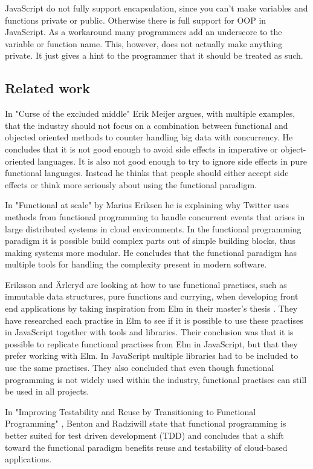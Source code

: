 \documentclass {article}
\begin{document}
JavaScript do not fully support encapsulation, since you can't make variables and functions private or public. Otherwise there is full support for OOP in JavaScript. As a workaround many programmers add an underscore to the variable or function name. This, however, does not actually make anything private. It just gives a hint to the programmer that it should be treated as such.
\subsection{Related work}
In "Curse of the excluded middle" \cite{meijer} Erik Meijer argues, with multiple examples, that the industry should not focus on a combination between functional and objected oriented methods to counter handling big data with concurrency. He concludes that it is not good enough to avoid side effects in imperative or object-oriented languages. It is also not good enough to try to ignore side effects in pure functional languages. Instead he thinks that people should either accept side effects or think more seriously about using the functional paradigm.

In "Functional at scale" \cite{eriksen} by Marius Eriksen he is explaining why Twitter uses methods from functional programming to handle concurrent events that arises in large distributed systems in cloud environments. In the functional programming paradigm it is possible build complex parts out of simple building blocks, thus making systems more modular. He concludes that the functional paradigm has multiple tools for handling the complexity present in modern software.

Eriksson and \"{A}rleryd are looking at how to use functional practises, such as immutable data structures, pure functions and currying, when developing front end applications by taking inspiration from Elm \cite{elm} in their master's thesis \cite{erikarl}. They have researched each practise in Elm to see if it is possible to use these practises in JavaScript together with tools and libraries. Their conclusion was that it is possible to replicate functional practises from Elm in JavaScript, but that they prefer working with Elm. In JavaScript multiple libraries had to be included to use the same practises. They also concluded that even though functional programming is not widely used within the industry, functional practises can still be used in all projects.

In "Improving Testability and Reuse by Transitioning to Functional Programming" \cite{benrad}, Benton and Radziwill state that functional programming is better suited for test driven development (TDD) and concludes that a shift toward the functional paradigm benefits reuse and testability of cloud-based applications.
\end{document}
